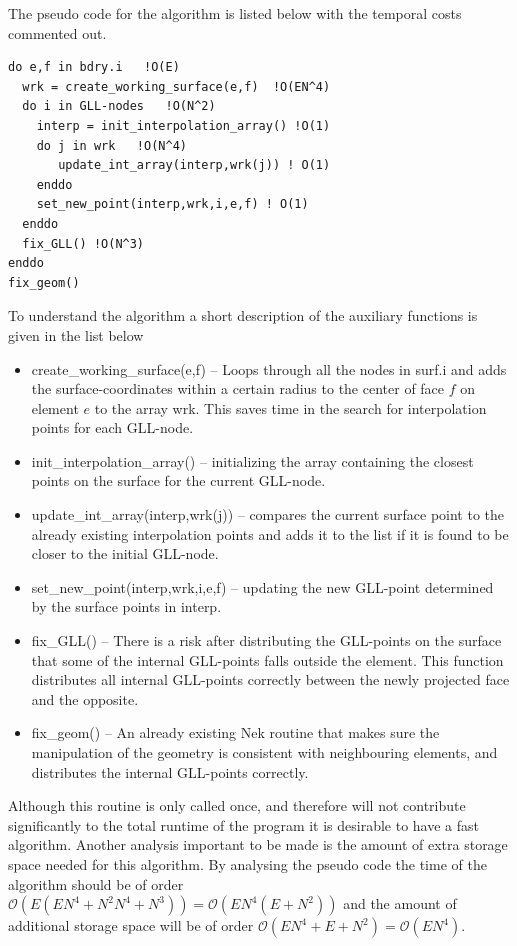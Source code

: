 The pseudo code for the algorithm is listed below with the temporal costs commented out.
%
\begingroup
\fontsize{12pt}{14pt}
\begin{lstlisting}[escapechar=|,frame=none]
do e,f in bdry.i   !O(E)
  wrk = create_working_surface(e,f)  !O(EN^4) 
  do i in GLL-nodes   !O(N^2)
    interp = init_interpolation_array() !O(1) 
    do j in wrk   !O(N^4)
       update_int_array(interp,wrk(j)) ! O(1)
    enddo
    set_new_point(interp,wrk,i,e,f) ! O(1)
  enddo
  fix_GLL() !O(N^3)
enddo
fix_geom()
\end{lstlisting}
\endgroup
% 
To understand the algorithm a short description of the auxiliary functions is 
given in the list below
\begin{itemize}
    \item create\_working\_surface(e,f) -- Loops through all the nodes in surf.i and adds the 
        surface-coordinates within a certain radius to the center of face $f$ on element $e$ to the array wrk.
        This saves time in the search for interpolation points for each GLL-node.
    \item init\_interpolation\_array() -- initializing the array containing the closest 
        points on the surface for the current GLL-node. 
    \item update\_int\_array(interp,wrk(j)) -- compares the current surface point to the 
        already existing interpolation points and adds it to the list if it is found to 
        be closer to the initial GLL-node.
    \item set\_new\_point(interp,wrk,i,e,f) -- updating the new GLL-point determined by the 
        surface points in interp.
    \item fix\_GLL() -- There is a risk after distributing the GLL-points on the surface that
        some of the internal GLL-points falls outside the element. This function distributes 
        all internal GLL-points correctly between the newly projected face and the opposite.
    \item fix\_geom() -- An already existing Nek routine that makes sure the manipulation of the 
        geometry is consistent with neighbouring elements, and distributes the internal GLL-points correctly.
\end{itemize}

Although this routine is only called once, and therefore will not contribute significantly 
to the total runtime of the program it is desirable to have a fast algorithm. Another analysis
important to be made is the amount of extra storage space needed for this algorithm.
By analysing the pseudo code the time of the algorithm should be of order $\mathcal{O}(E(EN^4+N^2N^4+N^3))=\mathcal{O}(EN^4(E+N^2))$
and the amount of additional storage space will be of order $\mathcal{O}(EN^4+E+N^2)=\mathcal{O}(EN^4)$.

